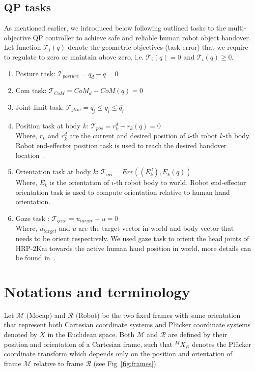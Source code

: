 \subsection{QP tasks}\label{QPTasks}
As mentioned earlier, we introduced below following outlined tasks to the multi-objective QP controller to achieve safe and reliable human robot object handover. Let function $\mathscr{T}_i(q)$ denote the geometric objectives (task error) that we require to regulate to zero or maintain above zero, i.e. $\mathscr{T}_i(q) = 0$ and $\mathscr{T}_i(q) \geq 0$.  

\begin{enumerate}[start=1,label={\bf\arabic*.}]

\item Posture task: $\mathscr{T}_{posture} = q_d - q = 0$  

\item Com task: $\mathscr{T}_{CoM} = CoM_d - CoM(q) = 0$

\item Joint limit task: $\mathscr{T}_{jlim} = \underline{q_i} \leq q_i \leq \overline{q_i}$  

\item Position task at body $k$: $\mathscr{T}_{pos} = r^d_k - r_k(q) = 0$\\
Where, $r_k$ and $r^d_k$ are the current and desired position of $i$-th robot $k$-th body. Robot end-effector position task is used to reach the desired handover location~\cite{ladder-HRP-2Kai}.

\item Orientation task at body $k$: $\mathscr{T}_{ori} = Err((E^d_k),  E_k(q))$\\
Where, $E_k$ is the orientation of $i$-th robot body to world. Robot end-effector orientation task is used to compute orientation relative to human hand orientation.

\item Gaze task : $\mathscr{T}_{gaze} =u_{target} - u = 0$\\
Where, $u_{target}$  and $u$ are the target vector in world and body vector that needs to be orient respectively. We used gaze task to orient the head joints of HRP-2Kai towards the active human hand position in world, more details can be found in~\cite{samy2017VecOriTask}.

\end{enumerate}



\section{Notations and terminology}
Let $\mathcal{M}$ (Mocap) and $\mathcal{R}$ (Robot) be the two fixed frames with same orientation that represent both Cartesian coordinate systems and Pl\"ucker coordinate systems denoted by $X$ in the Euclidean space. Both $\mathcal{M}$ and $\mathcal{R}$ are defined by their position and orientation of a Cartesian frame, such that ${}^MX_R$ denotes the Pl\"ucker coordinate transform which depends only on the position and orientation of frame $\mathcal{M}$ relative to frame $\mathcal{R}$ (see Fig~\ref{fig:frames}).

